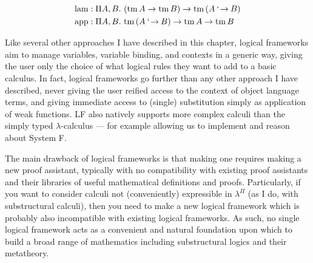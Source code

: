 \begin{align*}
  \mathrm{lam} &: \Pi A,B.~\plr{\mathrm{tm}\,A \to \mathrm{tm}\,B} \to
                 \mathrm{tm}\,\plr{A \qto B} \\
  \mathrm{app} &: \Pi A,B.~\mathrm{tm}\,\plr{A \qto B} \to
                 \mathrm{tm}\,A \to \mathrm{tm}\,B
\end{align*}

Like several other approaches I have described in this chapter, logical
frameworks aim to manage variables, variable binding, and contexts in a generic
way, giving the user only the choice of what logical rules they want to add to a
basic calculus.
In fact, logical frameworks go further than any other approach I have described,
never giving the user reified access to the context of object language terms,
and giving immediate access to (single) substitution simply as application of
weak functions.
LF also natively supports more complex calculi than the simply typed
$\lambda$-calculus --- for example allowing us to implement and reason about
System F.

The main drawback of logical frameworks is that making one requires making a new
proof assistant, typically with no compatibility with existing proof assistants
and their libraries of useful mathematical definitions and proofs.
Particularly, if you want to consider calculi not (conveniently) expressible in
$\lambda^\Pi$ (as I do, with substructural calculi), then you need to make a new
logical framework which is probably also incompatible with existing logical
frameworks.
As such, no single logical framework acts as a convenient and natural foundation
upon which to build a broad range of mathematics including substructural logics
and their metatheory.
